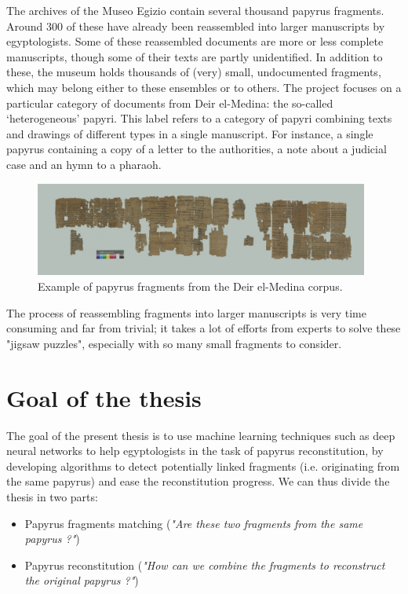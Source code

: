 \documentclass[11pt]{report}
\begin{document}
The archives of the Museo Egizio contain several thousand papyrus fragments. Around 300 of these have already been reassembled into larger manuscripts by egyptologists. Some of these reassembled documents are more or less complete manuscripts, though some of their texts are partly unidentified. In addition to these, the museum holds thousands of (very) small, undocumented fragments, which may belong either to these ensembles or to others.\newline
The project focuses on a particular category of documents from Deir el-Medina: the so-called ‘heterogeneous’ papyri. This label refers to a category of papyri combining texts and drawings of different types in a single manuscript. For instance, a single papyrus containing a copy of a letter to the authorities, a note about a judicial case and an hymn to a pharaoh.\newline

\begin{figure}[H]
\centering\includegraphics[width=11cm]{papyrus.PNG}
\caption{Example of papyrus fragments from the Deir el-Medina corpus.}
\label{papyrus}
\end{figure}

The process of reassembling fragments into larger manuscripts is very time consuming and far from trivial; it takes a lot of efforts from experts to solve these "jigsaw puzzles", especially with so many small fragments to consider.

\section{Goal of the thesis}

The goal of the present thesis is to use machine learning techniques such as deep neural networks to help egyptologists in the task of papyrus reconstitution, by developing algorithms to detect potentially linked fragments (i.e. originating from the same papyrus) and ease the reconstitution progress. We can thus divide the thesis in two parts:
\begin{itemize}
    \item Papyrus fragments matching (\emph{"Are these two fragments from the same papyrus ?"})
    \item Papyrus reconstitution (\emph{"How can we combine the fragments to reconstruct the original papyrus ?"})
\end{itemize}
\end{document}
